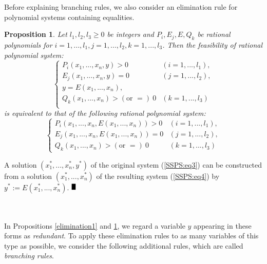 \documentclass{article}
\def\BBox{\rule{2mm}{3mm}}
\def\QED{\hfill$\BBox$}
\newenvironment{proof}
{\begin{rm}\par\smallskip\noindent{\bf Proof.}\quad}{\QED\end{rm}}
\newtheorem{prop}[thm]{\bfseries Proposition} %
\begin{document}
Before explaining branching rules, we also consider an elimination rule for polynomial systems containing equalities.
\begin{prop} \label{elimination2}
Let $l_{1},l_{2},l_3 \geq 0$ be integers and
$P_i,E_j,E,Q_k$ be rational polynomials for $i=1,...,l_1, j=1,...,l_2, k=1,...,l_3$.
Then the  feasibility of rational polynomial system:
\begin{equation} \label{SSPS:eq3}
 \begin{cases}
P_{i}(x_{1},...,x_{n},y) > 0 & (i=1,...,l_{1}), \\
E_{j}(x_{1},...,x_{n},y) = 0 & (j=1,...,l_{2}), \\
y = E(x_1,...,x_n), \\
Q_k(x_1,...,x_n) > (\text{or }=) \ 0 & (k=1,...,l_3) \\ 
\end{cases} 
\end{equation}
is equivalent to that of the following rational polynomial system:
\begin{equation} \label{SSPS:eq4}
\begin{cases}
P_{i}(x_{1},...,x_{n},E(x_1,...,x_n)) > 0 & (i=1,...,l_{1}), \\
E_{j}(x_{1},...,x_{n},E(x_1,...,x_n)) = 0 & (j=1,...,l_{2}), \\
Q_k(x_1,...,x_n) > (\text{or }=)  \ 0 & (k=1,...,l_3)
\end{cases}
\end{equation}
\end{prop}
\begin{proof}
A solution $(x_{1}^{*},...,x_{n}^{*},y^*)$ of the original system
(\ref{SSPS:eq3}) can be constructed 
from a solution $(x_{1}^{*},...,x_{n}^{*})$ of the resulting system (\ref{SSPS:eq4}) by
$y^{*}:=E(x_{1}^{*},...,x_{n}^{*})$. 
\end{proof}
\\
\\
In Propositions \ref{elimination1} and \ref{elimination2}, we regard a variable $y$ appearing in these forms
as {\it redundant}.
To apply these elimination rules to as many variables of this type as possible, we consider
the following additional rules, which are called {\it  branching rules}.
\end{document}
